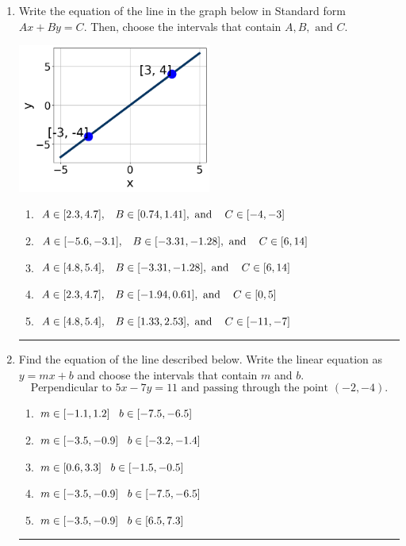 \documentclass[14pt]{extbook}
\newcommand{\litem}[1]{\item#1\hspace*{-1cm}\rule{\textwidth}{0.4pt}}
\begin{document}
\begin{enumerate}
\litem{
Write the equation of the line in the graph below in Standard form $Ax+By=C$. Then, choose the intervals that contain $A, B, \text{ and } C$.
\begin{center}
    \includegraphics[width=0.5\textwidth]{../Figures/linearGraphToStandardB.png}
\end{center}
\begin{enumerate}[label=\Alph*.]
\item \( A \in [2.3, 4.7], \hspace{3mm} B \in [0.74, 1.41], \text{ and } \hspace{3mm} C \in [-4, -3] \)
\item \( A \in [-5.6, -3.1], \hspace{3mm} B \in [-3.31, -1.28], \text{ and } \hspace{3mm} C \in [6, 14] \)
\item \( A \in [4.8, 5.4], \hspace{3mm} B \in [-3.31, -1.28], \text{ and } \hspace{3mm} C \in [6, 14] \)
\item \( A \in [2.3, 4.7], \hspace{3mm} B \in [-1.94, 0.61], \text{ and } \hspace{3mm} C \in [0, 5] \)
\item \( A \in [4.8, 5.4], \hspace{3mm} B \in [1.33, 2.53], \text{ and } \hspace{3mm} C \in [-11, -7] \)

\end{enumerate} }
\litem{
Find the equation of the line described below. Write the linear equation as $ y=mx+b $ and choose the intervals that contain $m$ and $b$.\[ \text{Perpendicular to } 5 x - 7 y = 11 \text{ and passing through the point } (-2, -4). \]\begin{enumerate}[label=\Alph*.]
\item \( m \in [-1.1, 1.2] \hspace*{3mm} b \in [-7.5, -6.5] \)
\item \( m \in [-3.5, -0.9] \hspace*{3mm} b \in [-3.2, -1.4] \)
\item \( m \in [0.6, 3.3] \hspace*{3mm} b \in [-1.5, -0.5] \)
\item \( m \in [-3.5, -0.9] \hspace*{3mm} b \in [-7.5, -6.5] \)
\item \( m \in [-3.5, -0.9] \hspace*{3mm} b \in [6.5, 7.3] \)


\end{enumerate}}
\end{enumerate}
\end{document}
